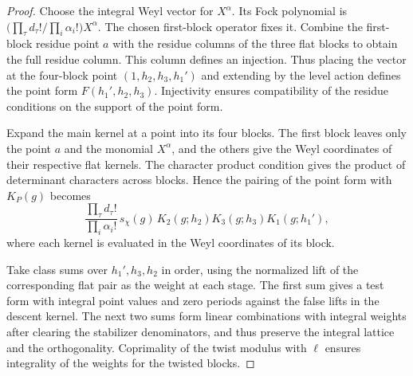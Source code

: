 \begin{proof}
Choose the integral Weyl vector for $X^\alpha$. Its Fock polynomial is $\bigl(\prod_\tau d_\tau!/\prod_i\alpha_i!\bigr)X^\alpha$. The chosen first-block operator fixes it. Combine the first-block residue point $a$ with the residue columns of the three flat blocks to obtain the full residue column. This column defines an injection. Thus placing the vector at the four-block point $(1,h_2,h_3,h_1')$ and extending by the level action defines the point form $F(h_1',h_2,h_3)$. Injectivity ensures compatibility of the residue conditions on the support of the point form.

Expand the main kernel at a point into its four blocks. The first block leaves only the point $a$ and the monomial $X^\alpha$, and the others give the Weyl coordinates of their respective flat kernels. The character product condition gives the product of determinant characters across blocks. Hence the pairing of the point form with $K_P(g)$ becomes
\[
 \frac{\prod_\tau d_\tau!}{\prod_i\alpha_i!}\,s_\chi(g)\,
 K_2(g;h_2)K_3(g;h_3)K_1(g;h_1'),
\]
where each kernel is evaluated in the Weyl coordinates of its block.

Take class sums over $h_1',h_3,h_2$ in order, using the normalized lift of the corresponding flat pair as the weight at each stage. The first sum gives a test form with integral point values and zero periods against the false lifts in the descent kernel. The next two sums form linear combinations with integral weights after clearing the stabilizer denominators, and thus preserve the integral lattice and the orthogonality. Coprimality of the twist modulus with $\ell$ ensures integrality of the weights for the twisted blocks.


\end{proof}
